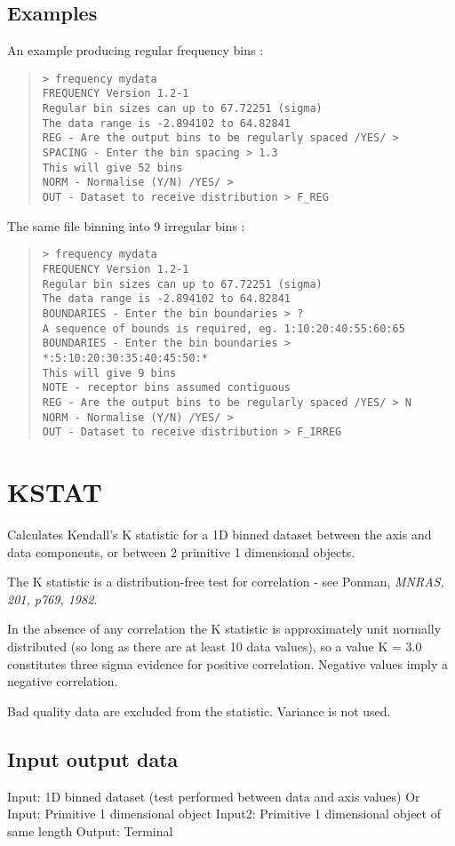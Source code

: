 \documentclass{book}
\renewcommand{\_}{{\tt\char'137}}     %
\begin{document}
\subsection{Examples}
An example producing regular frequency bins :
\begin{quote}\begin{verbatim}
> frequency mydata
FREQUENCY Version 1.2-1
Regular bin sizes can up to 67.72251 (sigma)
The data range is -2.894102 to 64.82841
REG - Are the output bins to be regularly spaced /YES/ >
SPACING - Enter the bin spacing > 1.3
This will give 52 bins
NORM - Normalise (Y/N) /YES/ >
OUT - Dataset to receive distribution > F_REG
\end{verbatim}\end{quote}
The same file binning into 9 irregular bins :
\begin{quote}\begin{verbatim}
> frequency mydata
FREQUENCY Version 1.2-1
Regular bin sizes can up to 67.72251 (sigma)
The data range is -2.894102 to 64.82841
BOUNDARIES - Enter the bin boundaries > ?
A sequence of bounds is required, eg. 1:10:20:40:55:60:65
BOUNDARIES - Enter the bin boundaries > *:5:10:20:30:35:40:45:50:*
This will give 9 bins
NOTE - receptor bins assumed contiguous
REG - Are the output bins to be regularly spaced /YES/ > N
NORM - Normalise (Y/N) /YES/ >
OUT - Dataset to receive distribution > F_IRREG
\end{verbatim}\end{quote}
\section{KSTAT}
Calculates Kendall's K statistic for a 1D binned dataset between
the axis and data components, or between 2 primitive 1 dimensional
objects.

The K statistic is a distribution-free test for correlation - see
Ponman, {\em MNRAS, 201, p769, 1982}.

In the absence of any correlation the K statistic is
approximately unit normally distributed (so long as there are at
least 10 data values), so a value K = 3.0 constitutes three sigma
evidence for positive correlation. Negative values imply a
negative correlation.

Bad quality data are excluded from the statistic. Variance is not
used.

\subsection{Input output data}
Input: 1D binned dataset (test performed between data and
axis values)
Or
Input: Primitive 1 dimensional object
Input2: Primitive 1 dimensional object of same length
Output: Terminal
\end{document}
